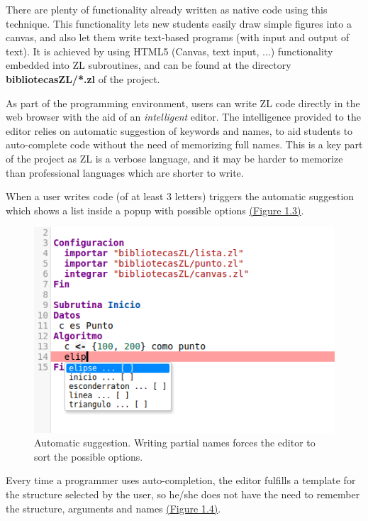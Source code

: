 \documentclass{report}
\begin{document}
	There are plenty of functionality already written as native code using this technique. This functionality lets new students easily draw simple figures into a canvas, and also let them write text-based programs (with input and output of text). It is achieved by using HTML5 (Canvas, text input, ...) functionality embedded into ZL subroutines, and can be found at the directory \textbf{bibliotecasZL/*.zl} of the project.  

	As part of the programming environment, users can write ZL code directly in the web browser with the aid of an \textit{intelligent} editor. The intelligence provided to the editor relies on automatic suggestion of keywords and names, to aid students to auto-complete code without the need of memorizing full names. This is a key part of the project as ZL is a verbose language, and it may be harder to memorize than professional languages which are shorter to write.
	
	When a user writes code (of at least 3 letters) triggers the automatic suggestion which shows a list inside a popup with possible options \hyperref[fig:beforecompletion]{(Figure 1.3)}.
	
	
\begin{figure}
\centering
\includegraphics[width=0.7\linewidth]{beforecompletion}
\caption[Automatic suggestion]{Automatic suggestion. Writing partial names forces the editor to sort the possible options.}
\label{fig:beforecompletion}
\end{figure}

	Every time a programmer uses auto-completion, the editor fulfills a template for the structure selected by the user, so he/she does not have the need to remember the structure, arguments and names \hyperref[fig:aftercompletion]{(Figure 1.4)}.
	
\end{document}
